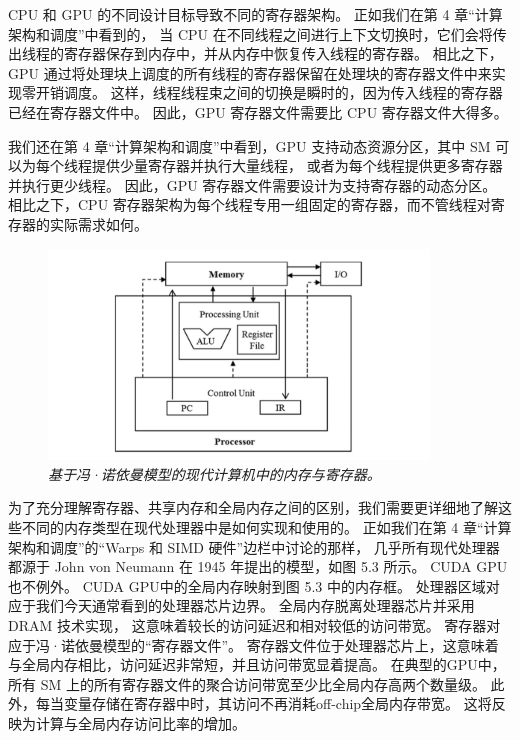 \begin{remark}
CPU 和 GPU 的不同设计目标导致不同的寄存器架构。 正如我们在第 4 章“计算架构和调度”中看到的，
当 CPU 在不同线程之间进行上下文切换时，它们会将传出线程的寄存器保存到内存中，并从内存中恢复传入线程的寄存器。 
相比之下，GPU 通过将处理块上调度的所有线程的寄存器保留在处理块的寄存器文件中来实现零开销调度。 
这样，线程线程束之间的切换是瞬时的，因为传入线程的寄存器已经在寄存器文件中。 
因此，GPU 寄存器文件需要比 CPU 寄存器文件大得多。

我们还在第 4 章“计算架构和调度”中看到，GPU 支持动态资源分区，其中 SM 可以为每个线程提供少量寄存器并执行大量线程，
或者为每个线程提供更多寄存器并执行更少线程。 因此，GPU 寄存器文件需要设计为支持寄存器的动态分区。 
相比之下，CPU 寄存器架构为每个线程专用一组固定的寄存器，而不管线程对寄存器的实际需求如何。
\end{remark}

\begin{figure}[H]
	\centering
	\includegraphics[width=0.9\textwidth]{figs/F5.3.png}
	\caption{\textit{基于冯·诺依曼模型的现代计算机中的内存与寄存器。}}
\end{figure}

为了充分理解寄存器、共享内存和全局内存之间的区别，我们需要更详细地了解这些不同的内存类型在现代处理器中是如何实现和使用的。 
正如我们在第 4 章“计算架构和调度”的“Warps 和 SIMD 硬件”边栏中讨论的那样，
几乎所有现代处理器都源于 John von Neumann 在 1945 年提出的模型，如图 5.3 所示。 
CUDA GPU也不例外。 CUDA GPU中的全局内存映射到图 5.3 中的内存框。 
处理器区域对应于我们今天通常看到的处理器芯片边界。 全局内存脱离处理器芯片并采用 DRAM 技术实现，
这意味着较长的访问延迟和相对较低的访问带宽。 寄存器对应于冯·诺依曼模型的“寄存器文件”。 
寄存器文件位于处理器芯片上，这意味着与全局内存相比，访问延迟非常短，并且访问带宽显着提高。 
在典型的GPU中，所有 SM 上的所有寄存器文件的聚合访问带宽至少比全局内存高两个数量级。 
此外，每当变量存储在寄存器中时，其访问不再消耗off-chip全局内存带宽。 这将反映为计算与全局内存访问比率的增加。

